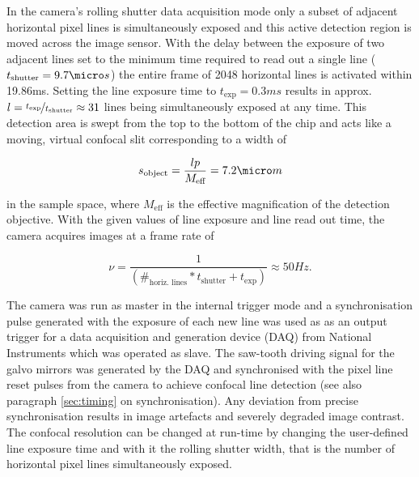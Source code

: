 \documentclass[12pt]{spieman}  %
\begin{document}
In the camera's rolling shutter data acquisition mode only a subset of adjacent horizontal pixel lines is simultaneously exposed and this active detection region is moved across the image sensor. With the delay between the exposure of two adjacent lines set to the minimum time required to read out a single line ($t_{\text{shutter}}=9.7\micro s$) the entire frame of 2048 horizontal lines is activated within 19.86ms. Setting the line exposure time to $t_{\text{exp}}=0.3ms$ results in approx. $l=\nicefrac{t_{\text{exp}}}{t_{\text{shutter}}}\approx31$  lines being simultaneously exposed at any time. This detection area is swept from the top to the bottom of the chip and acts like a moving, virtual confocal slit corresponding to a width of 

\begin{equation}
s_{\text{object}}=\frac{l p}{M_{\text{eff}}}= 7.2 \micro m 
\end{equation}

in the sample space, where $M_{\text{eff}}$ is the effective magnification of the detection objective. With the given values of line exposure and line read out time, the camera acquires images at a frame rate of 

\begin{equation}
\nu = \frac{1}{(\#_{\text{horiz. lines}}*t_{\text{shutter}}+t_{\text{exp}})} \approx 50Hz. 
\end{equation}

The camera was run as master in the internal trigger mode and a synchronisation pulse generated with the exposure of each new line was used as as an output trigger for a data acquisition and generation device (DAQ) from National Instruments which was operated as slave. The saw-tooth driving signal for the galvo mirrors was generated by the DAQ and synchronised with the pixel line reset pulses from the camera to achieve confocal line detection\cite{Baumgart2012} (see also paragraph \ref{sec:timing} on synchronisation). Any deviation from precise synchronisation results in image artefacts and severely degraded image contrast. The confocal resolution can be changed at run-time by changing the user-defined line exposure time and with it the rolling shutter width, that is the number of horizontal pixel lines simultaneously exposed.   
 
\end{document}
